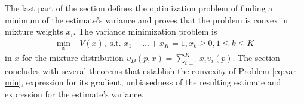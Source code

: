 The last part of the section defines the optimization problem of finding a minimum of the estimate's variance and proves that the problem is convex in mixture weights $x_i$.
The variance minimization problem is
\begin{align}
    \min_x \; & V(x), \; 
    \text{s.t. } x_1 + \dots + x_K = 1, x_k \ge 0, 1\!\le\! k \!\le\! K\label{eq:var-min}
\end{align}
in $x$ for the mixture distribution $\upsilon_D(p,x) = \sum_{i=1}^K x_i \upsilon_i(p)$. %
The section concludes with several theorems that establish the convexity of Problem \eqref{eq:var-min}, expression for its gradient, unbiasedness of the resulting estimate and expression for the estimate's variance.



